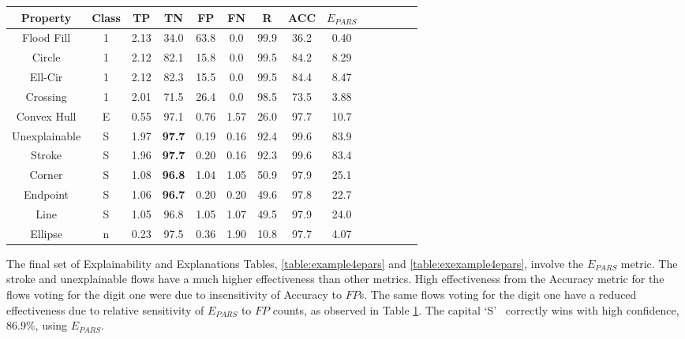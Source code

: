 \begin{table}[H]
    \renewcommand{\arraystretch}{1.3}
    \label{table:example4eff_metrics} 
    \begin{center}
    \begin{tabular}{| c | c | c | c | c | c | c | c | c | c | c | c | c | c |}
    \hline
    Property & Class & TP & TN & FP & FN & R & ACC & $E_{PARS}$ \\
    \hline
    \hline
    Flood Fill & 1 & 2.13 & 34.0 & 63.8 & 0.0 & 99.9 & 36.2 & 0.40 \\ 
    \hline
    Circle & 1 & 2.12 & 82.1 & 15.8 & 0.0 & 99.5 & 84.2 &  8.29 \\
    \hline
    Ell-Cir & 1 & 2.12 & 82.3 & 15.5 & 0.0 & 99.5 & 84.4 & 8.47 \\
    \hline
    Crossing & 1 & 2.01 & 71.5 & 26.4 & 0.0 & 98.5 & 73.5 & 3.88 \\
    \hline
    Convex Hull & E & 0.55 & 97.1 & 0.76 & 1.57 & 26.0 & 97.7 & 10.7 \\
    \hline
    Unexplainable & S & 1.97 & \bf{97.7} & 0.19 & 0.16 & 92.4 & 99.6 & 83.9 \\
    \hline
    Stroke & S & 1.96 & \bf{97.7} & 0.20 & 0.16 & 92.3 & 99.6 & 83.4 \\
    \hline
    Corner & S & 1.08 & \bf{96.8} & 1.04 & 1.05 & 50.9 & 97.9 & 25.1 \\
    \hline
    Endpoint & S & 1.06 & \bf{96.7} & 0.20 & 0.20 & 49.6 & 97.8 & 22.7 \\
    \hline
    Line & S & 1.05 & 96.8 & 1.05 & 1.07 & 49.5 & 97.9 & 24.0 \\
    \hline
    Ellipse & n & 0.23 & 97.5 & 0.36 & 1.90 & 10.8 & 97.7 & 4.07 \\
    \hline
    \end{tabular}
    \end{center}
\end{table}

The final set of Explainability and Explanations Tables,
\ref{table:example4epars} and \ref{table:exexample4epars}, involve the
$E_{PARS}$ metric. The stroke and unexplainable flows have a much higher
effectiveness than other metrics.  High effectiveness from the Accuracy
metric for the flows voting for the digit one were due to insensitivity of
Accuracy to $FP$s.  The same flows voting for the digit one have a reduced
effectiveness due to relative sensitivity of $E_{PARS}$ to $FP$ counts, as
observed in Table \ref{table:example4eff_metrics}.  The capital \lq{S}\rq~
correctly wins with high confidence, $86.9\%$, using $E_{PARS}$.


